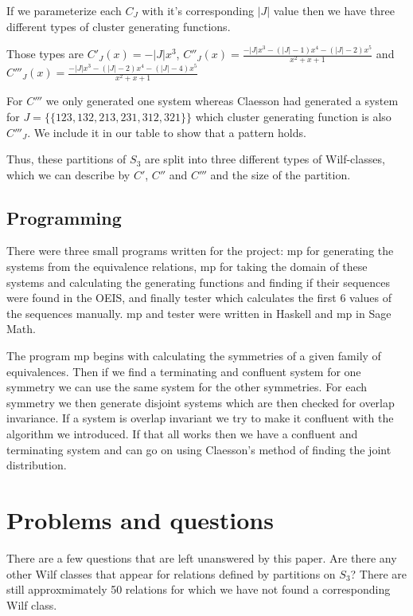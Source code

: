\documentclass[a4paper, 11pt, english]{article}
\theoremstyle{definition}
\newcommand{\Sym}{S}
\begin{document}
If we parameterize each $C_J$ with it's corresponding $|J|$ value then we have
three different types of cluster generating functions.

Those types are $C'_J(x) = -|J|x^3$, $C''_J(x) = \frac{-|J|x^3-(|J|-1)x^4-(|J|-2)x^5}{x^2+x+1}$
and $C'''_J(x) = \frac{-|J|x^3-(|J|-2)x^4-(|J|-4)x^5}{x^2+x+1}$

For $C'''$ we only generated one system whereas Claesson had generated a system for
$J = \{\{ 123, 132, 213, 231, 312, 321 \}\}$ which cluster generating function
is also $C'''_J$. We include it in our table to show that a pattern holds.

Thus, these partitions of $\Sym_3$ are split into three different types
of Wilf-classes, which we can describe by $C'$, $C''$ and $C'''$ and the size
of the partition.

\subsection{Programming}
There were three small programs written for the project: mp for generating the
systems from the equivalence relations, mp for taking the domain of these
systems and calculating the generating functions and finding if their sequences
were found in the OEIS, and finally tester which calculates the first 6 values
of the sequences manually. mp and tester were written in Haskell and mp in Sage Math. 

The program mp begins with calculating the symmetries of a given family of equivalences. Then if we
find a terminating and confluent system for one symmetry we can use the same system for the other
symmetries. For each symmetry we then generate disjoint systems which are then checked for overlap
invariance. If a system is overlap invariant we try to make it confluent with the algorithm we
introduced. If that all works then we have a confluent and terminating system and can go on using
Claesson's method of finding the joint distribution.


\section{Problems and questions}

There are a few questions that are left unanswered by this paper.
Are there any other Wilf classes that appear for relations defined by partitions on $\Sym_3$? There are
still approxmimately 50 relations for which we have not found a corresponding Wilf class. 
\end{document}

